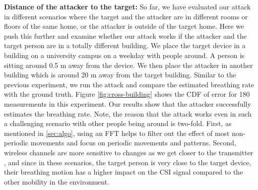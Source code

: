 \textbf{Distance of the attacker to the target:} So far, we have evaluated our attack in different scenarios where the target and the attacker are in different rooms or floors of the same home, or the attacker is outside of the target home. Here we push this further and examine whether our attack works if the attacker and the target person are in a totally different building.  We place the target device in a building on a university campus on a weekday with people around. A person is sitting around 0.5 m away from the device.  We then place the attacker in another building which is around 20 m away from the target building.  Similar to the previous experiment, we run the attack and compare the estimated breathing rate with the ground truth. Figure \ref{fig:cross-building} shows the CDF of error for 180 measurements in this experiment. Our results show that the attacker successfully estimates the breathing rate. Note, the reason that the attack works even in such a challenging scenario with other people being around is two-fold. First, as mentioned in \ref{sec:algo}, using an FFT helps to filter out the effect of most non-periodic movements and focus on periodic movements and patterns. Second, wireless channels are more sensitive to changes as we get closer to the transmitter \cite{abedi2020witag}, and since in these scenarios, the target person is very close to the target device, their breathing motion has a higher impact on the CSI signal compared to the other mobility in the environment. 



